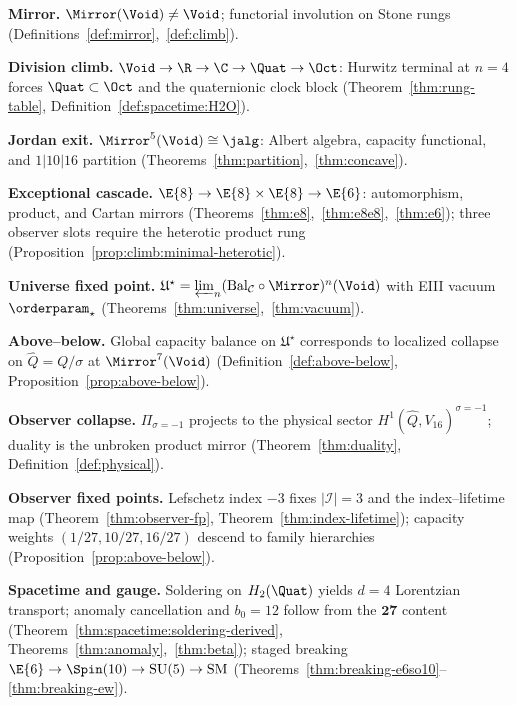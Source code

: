 \medskip
\noindent\textbf{Mirror.}
$\Mirror(\Void)\neq\Void$; functorial involution on Stone rungs
(Definitions~\ref{def:mirror},~\ref{def:climb}).

\medskip
\noindent\textbf{Division climb.}
$\Void\to\R\to\C\to\Quat\to\Oct$: Hurwitz terminal at $n=4$ forces
$\Quat\subset\Oct$ and the quaternionic clock block
(Theorem~\ref{thm:rung-table}, Definition~\ref{def:spacetime:H2O}).

\medskip
\noindent\textbf{Jordan exit.}
$\Mirror^5(\Void)\cong\jalg$: Albert algebra, capacity functional, and
$1|10|16$ partition (Theorems~\ref{thm:partition},~\ref{thm:concave}).

\medskip
\noindent\textbf{Exceptional cascade.}
$\E{8}\to\E{8}\times\E{8}\to\E{6}$: automorphism, product, and Cartan mirrors
(Theorems~\ref{thm:e8},~\ref{thm:e8e8},~\ref{thm:e6});
three observer slots require the heterotic product rung
(Proposition~\ref{prop:climb:minimal-heterotic}).

\medskip
\noindent\textbf{Universe fixed point.}
$\mathfrak{U}^\star=\varprojlim_n(\mathrm{Bal}_{\mathcal{C}}\circ\Mirror)^n(\Void)$
with EIII vacuum $\orderparam_\star$ (Theorems~\ref{thm:universe},~\ref{thm:vacuum}).

\medskip
\noindent\textbf{Above--below.}
Global capacity balance on $\mathfrak{U}^\star$ corresponds to localized collapse
on $\hat Q=Q/\sigma$ at $\Mirror^7(\Void)$
(Definition~\ref{def:above-below}, Proposition~\ref{prop:above-below}).

\medskip
\noindent\textbf{Observer collapse.}
$\Pi_{\sigma=-1}$ projects to the physical sector
$H^1(\hat Q,V_{16})^{\sigma=-1}$; duality is the unbroken product mirror
(Theorem~\ref{thm:duality}, Definition~\ref{def:physical}).

\medskip
\noindent\textbf{Observer fixed points.}
Lefschetz index $-3$ fixes $|\mathcal{I}|=3$ and the index--lifetime map
(Theorem~\ref{thm:observer-fp}, Theorem~\ref{thm:index-lifetime});
capacity weights $(1/27,10/27,16/27)$ descend to family hierarchies
(Proposition~\ref{prop:above-below}).

\medskip
\noindent\textbf{Spacetime and gauge.}
Soldering on $H_2(\Quat)$ yields $d=4$ Lorentzian transport; anomaly
cancellation and $b_0=12$ follow from the $\mathbf{27}$ content
(Theorem~\ref{thm:spacetime:soldering-derived}, Theorems~\ref{thm:anomaly},~\ref{thm:beta});
staged breaking $\E{6}\to\Spin(10)\to\mathrm{SU}(5)\to\mathrm{SM}$
(Theorems~\ref{thm:breaking-e6so10}--\ref{thm:breaking-ew}).

